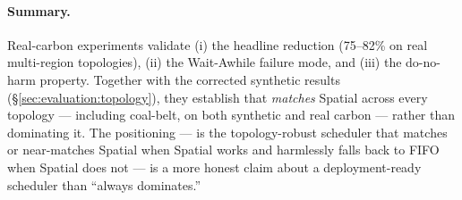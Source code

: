 \paragraph{Summary.} Real-carbon experiments validate (i) the headline
reduction (75--82\% on real multi-region topologies), (ii) the
Wait-Awhile failure mode, and (iii) the do-no-harm property. Together
with the corrected synthetic results
(\S\ref{sec:evaluation:topology}), they establish that \GreenFaaS{}
\emph{matches} Spatial across every topology --- including coal-belt,
on both synthetic and real carbon --- rather than dominating it. The
positioning --- \GreenFaaS{} is the
topology-robust scheduler that matches or near-matches Spatial when
Spatial works and harmlessly falls back to FIFO when Spatial does
not --- is a more honest claim about a deployment-ready
scheduler than ``always dominates.''
